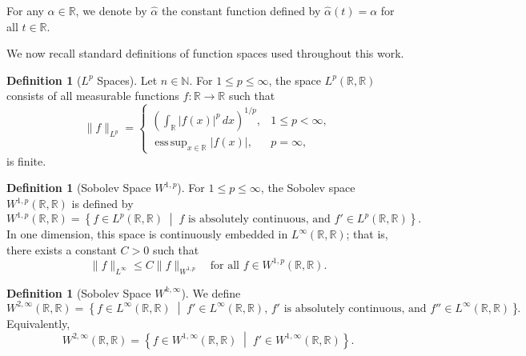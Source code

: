 \documentclass[12pt,letterpaper]{amsart}
\theoremstyle{definition}
\newtheorem{definition}[theorem]{Definition}
\theoremstyle{remark}
\numberwithin{equation}{section}
\begin{document}
For any $ \alpha \in \mathbb{R} $, we denote by $ \hat{\alpha} $ the constant function defined by $ \hat{\alpha}(t) = \alpha $ for all $ t \in \mathbb{R} $.




We now recall standard definitions of function spaces used throughout this work.




\begin{definition}[$ L^p $ Spaces]
Let $ n \in \mathbb{N} $. For $ 1 \le p \le \infty $, the space $ L^p(\mathbb{R}, \mathbb{R}) $ consists of all measurable functions $ f \colon \mathbb{R} \to \mathbb{R} $ such that
$$
\| f \|_{L^p} =
\begin{cases}
\left( \displaystyle\int_{\mathbb{R}} |f(x)|^p \, dx \right)^{1/p}, & 1 \le p < \infty, \\[6pt]
\displaystyle \operatorname{ess\,sup}_{x \in \mathbb{R}} |f(x)|, & p = \infty,
\end{cases}
$$
is finite.
\end{definition}




\begin{definition}[Sobolev Space $ W^{1,p} $]
For $ 1 \le p \le \infty $, the Sobolev space $ W^{1,p}(\mathbb{R}, \mathbb{R}) $ is defined by
$$
W^{1,p}(\mathbb{R}, \mathbb{R}) = \left\{ f \in L^p(\mathbb{R}, \mathbb{R}) \;\middle|\; f \text{ is absolutely continuous, and } f' \in L^p(\mathbb{R}, \mathbb{R}) \right\}.
$$
In one dimension, this space is continuously embedded in $ L^\infty(\mathbb{R}, \mathbb{R}) $; that is, there exists a constant $ C > 0 $ such that
$$
\| f \|_{L^\infty} \le C \| f \|_{W^{1,p}} \quad \text{for all } f \in W^{1,p}(\mathbb{R}, \mathbb{R}).
$$
\end{definition}




\begin{definition}[Sobolev Space $ W^{k,\infty} $]
We define
$$
W^{2,\infty}(\mathbb{R}, \mathbb{R})
=
\left\{
f \in L^\infty(\mathbb{R}, \mathbb{R})
\;\middle|\;
f' \in L^\infty(\mathbb{R}, \mathbb{R}),\,
f' \text{ is absolutely continuous, and } f'' \in L^\infty(\mathbb{R}, \mathbb{R})
\right\}.
$$
Equivalently,
$$
W^{2,\infty}(\mathbb{R}, \mathbb{R})
=
\left\{ f \in W^{1,\infty}(\mathbb{R}, \mathbb{R}) \;\middle|\; f' \in W^{1,\infty}(\mathbb{R}, \mathbb{R}) \right\}.
$$
\end{definition}
\end{document}
